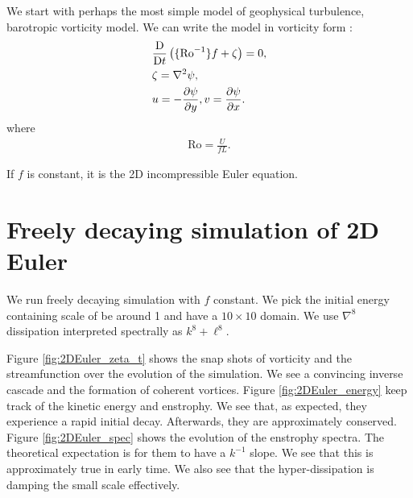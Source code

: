 \graphicspath{{Baro_vort/code/plot_snap/figs/}}

We start with perhaps the most simple model of geophysical turbulence, barotropic vorticity model. We can write the model in vorticity form \parencite[\S 4.2.1]{Vallis_17}:
\begin{align}
    &\frac{\mathrm{D}}{\mathrm{D} t}\left( \{\text{Ro}^{-1}\}f+\zeta \right) = 0,\\
    &\zeta = \nabla^2\psi,\\
    &u = -\frac{\partial\psi}{\partial y}, v = \frac{\partial\psi}{\partial x}.
\end{align}
where
\begin{align}
    \text{Ro} = \frac{U}{fL}.
\end{align}

If $f$ is constant, it is the 2D incompressible Euler equation. 

\section{Freely decaying simulation of 2D Euler}
We run freely decaying simulation with $f$ constant. We pick the initial energy containing scale of be around 1 and have a $10\times 10$ domain. We use $\nabla^8$ dissipation interpreted spectrally as $k^8+\ell^8$. 

Figure \ref{fig:2DEuler_zeta_t} shows the snap shots of vorticity and the streamfunction over the evolution of the simulation. We see a convincing inverse cascade and the formation of coherent vortices. Figure \ref{fig:2DEuler_energy} keep track of the kinetic energy and enstrophy. We see that, as expected, they experience a rapid initial decay. Afterwards, they are approximately conserved. Figure \ref{fig:2DEuler_spec} shows the evolution of the enstrophy spectra. The theoretical expectation is for them to have a $k^{-1}$ slope. We see that this is approximately true in early time. We also see that the hyper-dissipation is damping the small scale effectively.

